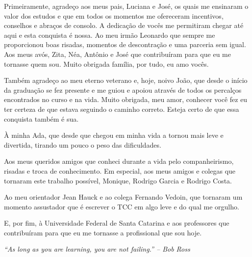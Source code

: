 \documentclass[
    12pt,       %
    openright,      %
    twoside,      %
    a4paper,      %
    english,      %
    french,       %
    spanish,      %
    brazil,       %
    ]{abntex2}
\begin{document}
  \begin{agradecimentos}
  
  Primeiramente, agradeço aos meus pais, Luciana e José, os quais me ensinaram o valor dos estudos e que em todos os momentos me ofereceram incentivos, conselhos e abraços de consolo. A dedicação de vocês me permitiram chegar até aqui e esta conquista é nossa. Ao meu irmão Leonardo que sempre me proporcionou boas risadas, momentos de descontração e uma parceria sem igual. Aos meus avós, Zita, Néa, Antônio e José que contribuíram para que eu me tornasse quem sou. Muito obrigada família, por tudo, eu amo vocês.
  
  Também agradeço ao meu eterno veterano e, hoje, noivo João, que desde o início da graduação se fez presente e me guiou e apoiou através de todos os percalços encontrados no curso e na vida. Muito obrigada, meu amor, conhecer você fez eu ter certeza de que estava seguindo o caminho correto. Esteja certo de que essa conquista também é sua. 
  
  À minha Ada, que desde que chegou em minha vida a tornou mais leve e divertida, tirando um pouco o peso das dificuldades.
  
  Aos meus queridos amigos que conheci durante a vida pelo companheirismo, risadas e troca de conhecimento. Em especial, aos meus amigos e colegas que tornaram este trabalho possível, Monique, Rodrigo Garcia e Rodrigo Costa.
  
  Ao meu orientador Jean Hauck e ao colega Fernando Vedoin, que tornaram um momento assustador que é escrever o TCC em algo leve e do qual me orgulho. 
  
  E, por fim, à Universidade Federal de Santa Catarina e aos professores que  contribuíram para que eu me tornasse a profissional que sou hoje.
  
  \end{agradecimentos}

  \begin{epigrafe}
      \vspace*{\fill}
    \begin{flushright}
      \textit{“As long as you are learning, you are not failing.” – Bob Ross}
    \end{flushright}
  \end{epigrafe}

\end{document}
